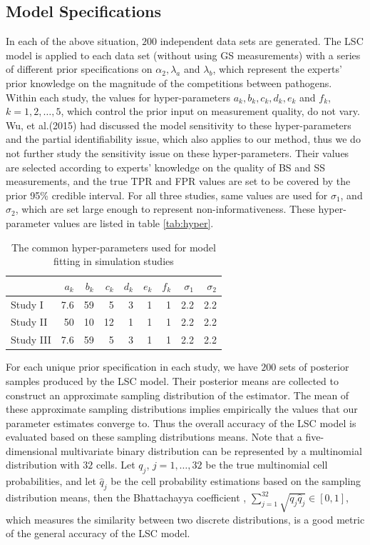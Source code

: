 \documentclass[11 pt, a4paper]{article}  %
\begin{document}
\subsection{Model Specifications}
In each of the above situation, $200$ independent data sets are generated. The LSC model is applied to each data set (without using GS measurements) with a series of different prior specifications on $\alpha_2, \lambda_a$ and $\lambda_b$, which represent the experts' prior knowledge on the magnitude of the competitions between pathogens. Within each study, the values for hyper-parameters $a_k, b_k, c_k, d_k, e_k$ and $f_k$, $k = 1, 2, \ldots, 5$, which control the prior input on measurement quality, do not vary. Wu, et al.(2015) \cite{wu2015partially} had discussed the model sensitivity to these hyper-parameters and the partial identifiability issue, which also applies to our method, thus we do not further study the sensitivity issue on these hyper-parameters. Their values are selected according to experts' knowledge on the quality of BS and SS measurements, and the true TPR and FPR values are set to be covered by the prior 95\% credible interval. For all three studies, same values are used for $\sigma_1$, and $\sigma_2$, which are set large enough to represent non-informativeness. These hyper-parameter values are listed in table \ref{tab:hyper}. \\


\begin{table}[h]
\centering
\caption{The common hyper-parameters used for model fitting in simulation studies}
\label{tab:study3}
\begin{tabular}{lrrrrrrrr}
\hline
          & $a_k$    & $b_k$     & $c_k$     & $d_k$     & $e_k$ & $f_k$ & $\sigma_1$  & $\sigma_2$    \\ \hline
Study I   & 7.6 & 59  & 5  & 3  & 1 & 1 & 2.2 & 2.2 \\
Study II  & 50 & 10  & 12  & 1  & 1 & 1 & 2.2 & 2.2 \\
Study III & 7.6 & 59  & 5  & 3  & 1 & 1 & 2.2 & 2.2 \\ \hline
\end{tabular}
\end{table}


For each unique prior specification in each study, we have $200$ sets of posterior samples produced by the LSC model. Their posterior means are collected to construct an approximate sampling distribution of the estimator. The mean of these approximate sampling distributions implies empirically the values that our parameter estimates converge to. Thus the overall accuracy of the LSC model is evaluated based on these sampling distributions means. Note that a five-dimensional multivariate binary distribution can be represented by a multinomial distribution with $32$ cells. Let $q_{j}$, $j = 1, \ldots, 32$ be the true multinomial cell probabilities, and let $\hat{q}_j$ be the cell probability estimations based on the sampling distribution means, then the Bhattachayya coefficient \cite{bhattachayya1943measure}, $\sum_{j=1}^{32}\sqrt{q_j \hat{q}_j} \in [0, 1]$, which measures the similarity between two discrete distributions, is a good metric of the general accuracy of the LSC model. \\
\end{document}
